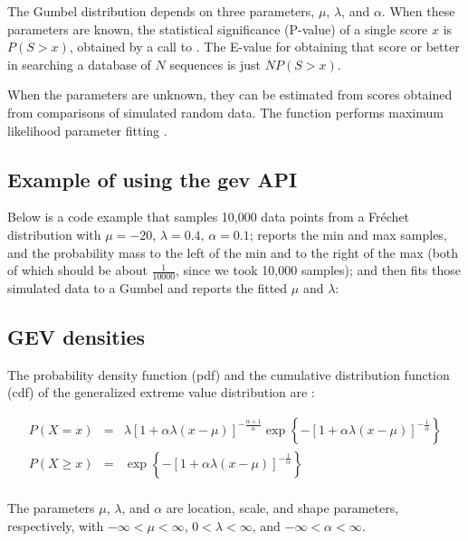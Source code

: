 The Gumbel distribution depends on three parameters, $\mu$, $\lambda$,
and $\alpha$. When these parameters are known, the statistical
significance (P-value) of a single score $x$ is $P(S>x)$, obtained by
a call to .  The E-value for obtaining that
score or better in searching a database of $N$ sequences is just
$NP(S>x)$.

When the parameters are unknown, they can be estimated from scores
obtained from comparisons of simulated random data. The
 function performs maximum likelihood
parameter fitting \citep{Coles01}.

\subsection{Example of using the gev API}

Below is a code example that samples 10,000 data points from a
Fr\'{e}chet distribution with $\mu=-20$, $\lambda=0.4$, $\alpha=0.1$;
reports the min and max samples, and the probability mass to the left
of the min and to the right of the max (both of which should be about
$\frac{1}{10000}$, since we took 10,000 samples); and then fits those
simulated data to a Gumbel and reports the fitted $\mu$ and $\lambda$:



\subsection{GEV densities}

The probability density function (pdf) and the cumulative distribution
function (cdf) of the generalized extreme value distribution are
\citep{Coles01}:

\begin{eqnarray}
P(X=x) & = & \lambda \left[ 1 + \alpha \lambda (x - \mu) \right]^{-\frac{\alpha+1}{\alpha}}
       \exp \left\{ - \left[ 1 + \alpha \lambda (x - \mu)
       \right]^{-\frac{1}{\alpha}} \right\} 
\\%
\label{eqn:gev_density}
P(X \geq x) & = & \exp \left\{ - \left[ 1 +
     \alpha\lambda(x-\mu) \right]^{-\frac{1}{\alpha}} \right\} 
\\%
\label{eqn:gev_distribution}
\end{eqnarray}

The parameters $\mu$, $\lambda$, and $\alpha$ are location, scale, and
shape parameters, respectively, with $-\infty < \mu < \infty$, $0 <
\lambda < \infty$, and $-\infty < \alpha < \infty$.

